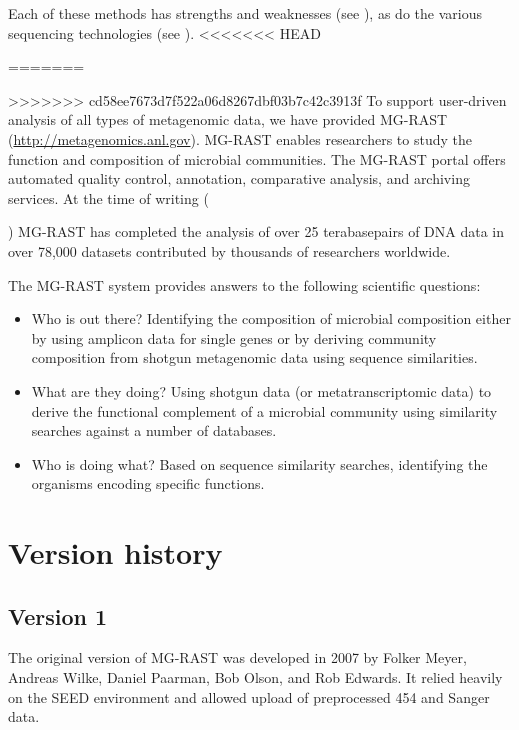 \documentclass[12pt,fullpage]{report}
\begin{document}
\noindent
Each of these methods has strengths and weaknesses (see \cite{THOMASREVIEW}), as do the various sequencing technologies (see \cite{LOMAN}).
<<<<<<< HEAD


=======


>>>>>>> cd58ee7673d7f522a06d8267dbf03b7c42c3913f
To support user-driven analysis of all types of metagenomic data, we have provided MG-RAST \cite{MG-RAST} (\url{http://metagenomics.anl.gov}). MG-RAST enables researchers to study the function and composition of microbial communities.
The MG-RAST portal offers automated quality control, annotation, comparative analysis, and archiving services.
At the time of writing (\date{\today}) MG-RAST has completed the analysis of over 25 terabasepairs of DNA data in over 78,000 datasets contributed by thousands of researchers worldwide.

The MG-RAST system provides answers to the following scientific questions:
\begin{itemize}
\item Who is out there?
Identifying the composition of microbial composition either by using amplicon data for single genes or by deriving community composition from shotgun metagenomic data using sequence similarities.

\item What are they doing?
Using shotgun data (or metatranscriptomic data) to derive the functional complement of a microbial community using similarity searches against a number of databases.

\item Who is doing what?
Based on sequence similarity searches, identifying the organisms encoding specific functions.

\end{itemize}


\section{Version history}
\subsection*{Version 1}
The original version of MG-RAST was developed in 2007 by Folker Meyer, Andreas Wilke, Daniel Paarman, Bob Olson, and Rob Edwards. It relied heavily on the \gls{SEED}\cite{SUBSYSTEMS} environment and allowed upload of preprocessed 454 and Sanger data.
\end{document}
